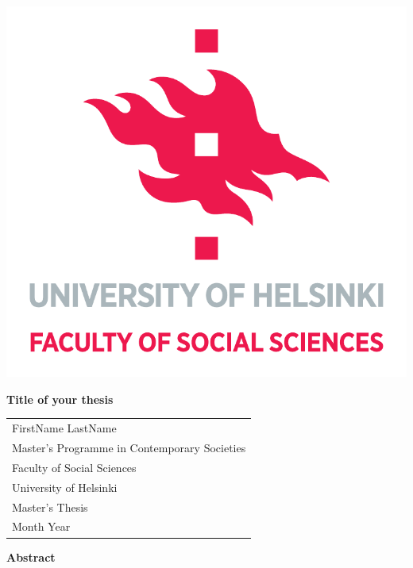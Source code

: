 \documentclass[12pt,a4paper]{article}
\begin{document}

\vspace{3cm}


\begin{flushleft}
\includegraphics[width=0.2\linewidth]{figures/HY__TJ23_valtiL_EN_V1__CMYK}
\end{flushleft}

\vspace{5cm}

\begin{center}
{\LARGE \bf Title of your thesis }
\end{center}

\vspace{12cm}

\begin{flushright}
\singlespacing
\begin{tabular}{l}
{FirstName LastName} \\
{Master's Programme in Contemporary Societies} \\
{Faculty of Social Sciences} \\
{University of Helsinki} \\
{Master's Thesis} \\
{Month Year}
\end{tabular}
\end{flushright}


\newpage


\setlength{\parindent}{0pt}   					%
\setlength{\parskip}{6pt plus 2pt minus 1pt}    	%


\begin{centering}

{\bf Abstract}

\end{centering}

\end{document}
